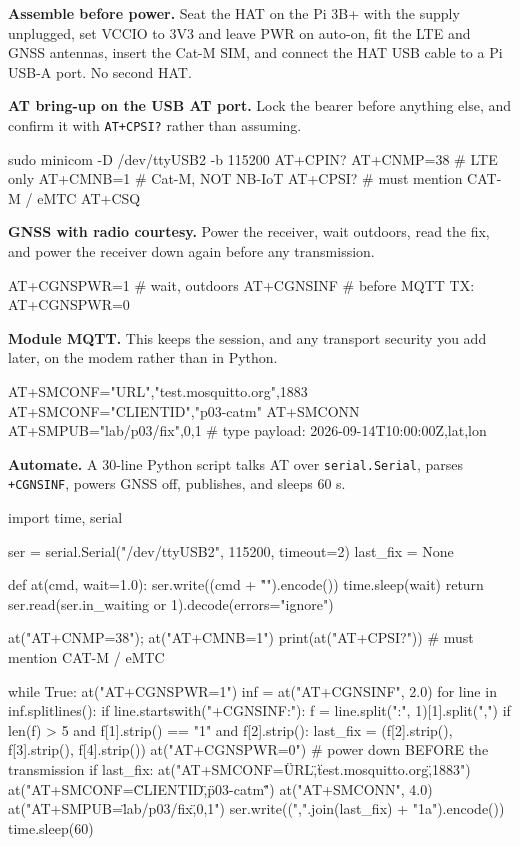 \begin{steps}
\item \textbf{Assemble before power.} Seat the HAT on the Pi 3B+ with the supply unplugged, set VCCIO to 3V3 and leave PWR on auto-on, fit the LTE and GNSS antennas, insert the Cat-M SIM, and connect the HAT USB cable to a Pi USB-A port. No second HAT.

\item \textbf{AT bring-up on the USB AT port.} Lock the bearer before anything else, and confirm it with \texttt{AT+CPSI?} rather than assuming.
\begin{atcode}
sudo minicom -D /dev/ttyUSB2 -b 115200
AT+CPIN?
AT+CNMP=38          # LTE only
AT+CMNB=1           # Cat-M, NOT NB-IoT
AT+CPSI?            # must mention CAT-M / eMTC
AT+CSQ
\end{atcode}

\item \textbf{GNSS with radio courtesy.} Power the receiver, wait outdoors, read the fix, and power the receiver down again before any transmission.
\begin{atcode}
AT+CGNSPWR=1
# wait, outdoors
AT+CGNSINF
# before MQTT TX:
AT+CGNSPWR=0
\end{atcode}

\item \textbf{Module MQTT.} This keeps the session, and any transport security you add later, on the modem rather than in Python.
\begin{atcode}
AT+SMCONF="URL","test.mosquitto.org",1883
AT+SMCONF="CLIENTID","p03-catm"
AT+SMCONN
AT+SMPUB="lab/p03/fix",0,1
# type payload:  2026-09-14T10:00:00Z,lat,lon
\end{atcode}

\item \textbf{Automate.} A 30-line Python script talks AT over \texttt{serial.Serial}, parses \texttt{+CGNSINF}, powers GNSS off, publishes, and sleeps 60 s.
\begin{pycode}
import time, serial

ser = serial.Serial("/dev/ttyUSB2", 115200, timeout=2)
last_fix = None

def at(cmd, wait=1.0):
    ser.write((cmd + "\r\n").encode())
    time.sleep(wait)
    return ser.read(ser.in_waiting or 1).decode(errors="ignore")

at("AT+CNMP=38"); at("AT+CMNB=1")
print(at("AT+CPSI?"))          # must mention CAT-M / eMTC

while True:
    at("AT+CGNSPWR=1")
    inf = at("AT+CGNSINF", 2.0)
    for line in inf.splitlines():
        if line.startswith("+CGNSINF:"):
            f = line.split(":", 1)[1].split(",")
            if len(f) > 5 and f[1].strip() == "1" and f[2].strip():
                last_fix = (f[2].strip(), f[3].strip(), f[4].strip())
    at("AT+CGNSPWR=0")         # power down BEFORE the transmission
    if last_fix:
        at("AT+SMCONF=\"URL\",\"test.mosquitto.org\",1883")
        at("AT+SMCONF=\"CLIENTID\",\"p03-catm\"")
        at("AT+SMCONN", 4.0)
        at("AT+SMPUB=\"lab/p03/fix\",0,1")
        ser.write((",".join(last_fix) + "\x1a").encode())
    time.sleep(60)
\end{pycode}


\end{steps}
